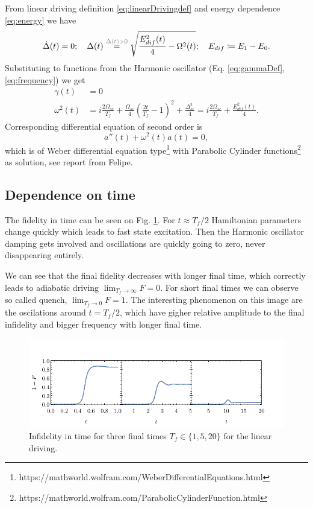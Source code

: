 From linear driving definition \ref{eq:linearDrivingdef} and energy dependence \ref{eq:energy} we have
\begin{equation}
    \dot \Delta(t)=0;\quad \Delta(t) \overset{\textcolor{gray}{\Delta(t)>0}}{=} \sqrt{\frac{E^2_{dif}(t)}{4}-\Omega^2(t)};\quad E_{dif}\coloneqq E_1-E_0.
\end{equation}
Substituting to functions from the Harmonic oscillator (Eq. \ref{eq:gammaDef}, \ref{eq:frequency}) we get 
\begin{align}
    \gamma(t) &= 0\\
    \omega^2(t)&=i\frac{2\Omega_{sc}}{T_f}+\frac{\Omega_{sc}}{4}\left(\frac{2t}{T_f}-1\right)^2+\frac{\Delta_{sc}^2}{4}=i\frac{2\Omega_{sc}}{T_f}+\frac{E^2_{dif}(t)}{4}.
    \label{eq:oscillationsLinear}
\end{align}
Corresponding differential equation of second order is
\begin{equation}
    a''(t)+\omega^2(t) a(t)=0,
\end{equation}
which is of Weber differential equation type\footnote{https://mathworld.wolfram.com/WeberDifferentialEquations.html} with Parabolic Cylinder functions\footnote{https://mathworld.wolfram.com/ParabolicCylinderFunction.html} as solution, see report from Felipe. 

\subsection{Dependence on time}
The fidelity in time can be seen on Fig. \ref{fig:infidelityTimePlotLin}. For $t\approx T_f/2$ Hamiltonian parameters change quickly which leads to fast state excitation. Then the Harmonic oscillator damping gets involved and oscillations are quickly going to zero, never disappearing entirely.

We can see that the final fidelity decreases with longer final time, which correctly leads to adiabatic driving $\lim_{T_f\rightarrow \infty} F=0$. For short final times we can observe so called quench, $\lim_{T_f\rightarrow 0} F=1$. The interesting phenomenon on this image are the oscilations around $t=T_f/2$, which have gigher relative amplitude to the final infidelity and bigger frequency with longer final time. 

\begin{figure}[H]
    \centering 
    \includegraphics[scale=1.185]{../img/infidelityInTimePlot1.pdf}
    \caption{Infidelity in time for three final times $T_f\in\{1,5,20\}$ for the linear driving.}
  \label{fig:infidelityTimePlotLin}
\end{figure}

